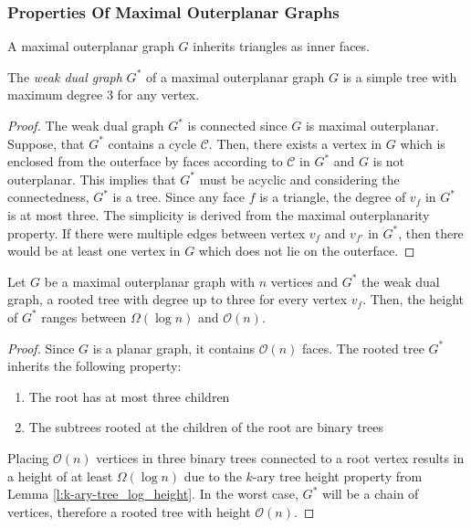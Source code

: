 \subsubsection{Properties Of Maximal Outerplanar Graphs}
\begin{lemma}
	A maximal outerplanar graph $G$ inherits triangles as inner faces.
\end{lemma}
\begin{lemma}\label{l:outerplanar-dual-tree-degree-3}
	The \emph{weak dual graph} $G^*$ of a maximal outerplanar graph $G$ is a simple tree with maximum degree 3 for any vertex.
\end{lemma}
\begin{proof}
	The weak dual graph $G^*$ is connected since $G$ is maximal outerplanar. Suppose, that $G^*$ contains a cycle $\mathcal{C}$. Then, there exists a vertex in $G$ which is enclosed from the outerface by faces according to $\mathcal{C}$ in $G^*$ and $G$ is not outerplanar. This implies that $G^*$ must be acyclic and considering the connectedness, $G^*$ is a tree. Since any face $f$ is a triangle, the degree of $v_f$ in $G^*$ is at most three. The simplicity is derived from the maximal outerplanarity property. If there were multiple edges between vertex $v_f$ and $v_{f'}$ in $G^*$, then there would be at least one vertex in $G$ which does not lie on the outerface.
\end{proof}
\begin{lemma}
	Let $G$ be a maximal outerplanar graph with $n$ vertices and $G^*$ the weak dual graph, a rooted tree with degree up to three for every vertex $v_f$. Then, the height of $G^*$ ranges between $\Omega(\log n)$ and $\mathcal{O}(n)$.
\end{lemma}
\begin{proof}
	Since $G$ is a planar graph, it contains $\mathcal{O}(n)$ faces. The rooted tree $G^*$ inherits the following property:
	\begin{enumerate}
		\item The root has at most three children
		\item The subtrees rooted at the children of the root are binary trees
	\end{enumerate}
	Placing $\mathcal{O}(n)$ vertices in three binary trees connected to a root vertex results in a height of at least $\Omega(\log n)$ due to the $k$-ary tree height property from Lemma \ref{l:k-ary-tree_log_height}. In the worst case, $G^*$ will be a chain of vertices, therefore a rooted tree with height $\mathcal{O}(n)$.
\end{proof}

